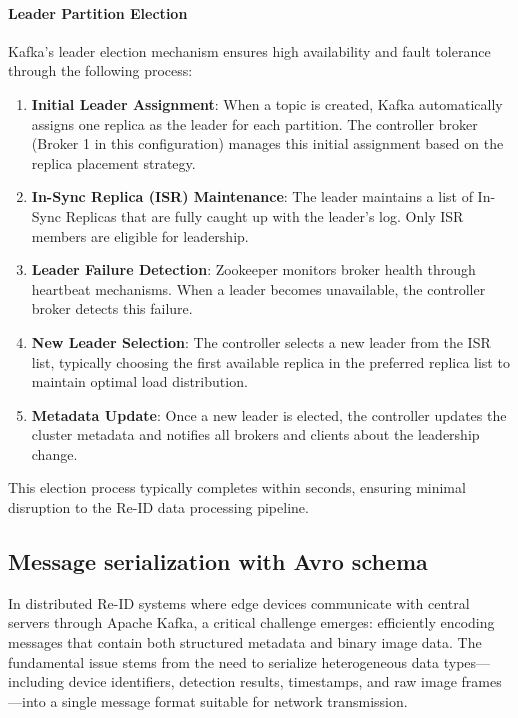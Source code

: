 \paragraph{Leader Partition Election}

Kafka's leader election mechanism ensures high availability and fault tolerance through the following process:

\begin{enumerate}
    \item \textbf{Initial Leader Assignment}: When a topic is created, Kafka automatically assigns one replica as the leader for each partition. The controller broker (Broker 1 in this configuration) manages this initial assignment based on the replica placement strategy.
    
    \item \textbf{In-Sync Replica (ISR) Maintenance}: The leader maintains a list of In-Sync Replicas that are fully caught up with the leader's log. Only ISR members are eligible for leadership.
    
    \item \textbf{Leader Failure Detection}: Zookeeper monitors broker health through heartbeat mechanisms. When a leader becomes unavailable, the controller broker detects this failure.
    
    \item \textbf{New Leader Selection}: The controller selects a new leader from the ISR list, typically choosing the first available replica in the preferred replica list to maintain optimal load distribution.
    
    \item \textbf{Metadata Update}: Once a new leader is elected, the controller updates the cluster metadata and notifies all brokers and clients about the leadership change.
\end{enumerate}

This election process typically completes within seconds, ensuring minimal disruption to the Re-ID data processing pipeline.

\subsection{Message serialization with Avro schema}
\label{sec:message_serialization}


In distributed Re-ID systems where edge devices communicate with central servers through Apache Kafka, a critical challenge emerges: efficiently encoding messages that contain both structured metadata and binary image data. The fundamental issue stems from the need to serialize heterogeneous data types—including device identifiers, detection results, timestamps, and raw image frames—into a single message format suitable for network transmission.

